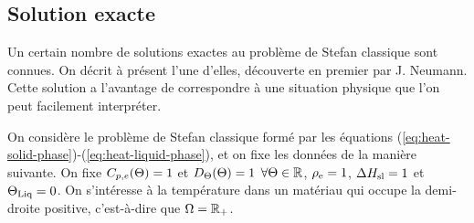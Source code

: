 
\subsection*{Solution exacte}
Un certain nombre de solutions exactes au problème de Stefan
classique sont connues. On décrit à présent l'une d'elles, découverte en
premier par J. Neumann. Cette solution a l'avantage de correspondre à
une situation physique que l'on peut facilement interpréter.

On considère le problème de Stefan classique formé par les équations
(\ref{eq:heat-solid-phase})-(\ref{eq:heat-liquid-phase}), et on fixe
les données de la manière suivante. On fixe
$C_{p,e}(\Theta) = 1$ et
$D_\Theta(\Theta)=1$ $\forall\Theta \in \mathbb
R$, $\rho_\mathrm{e} = 1$, $\Delta H_\mathrm{sl} = 1$ et $\Theta_\text{Liq} =
0$. On s'intéresse à la température dans un matériau qui occupe la
demi-droite positive, c'est-à-dire que $\Omega = \mathbb R_+$.

